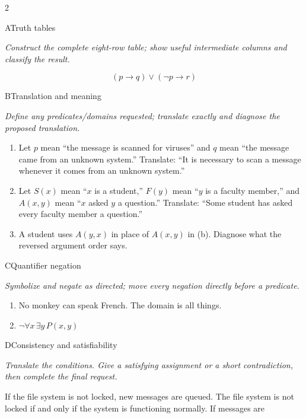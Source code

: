 \documentclass[9pt]{extarticle}
\begin{document}
\CoreWorkArea
\FormBreak
{}
\begin{multicols}{2}
\begin{CoreProblem}{A}{Truth tables}
{\scriptsize\textit{Construct the complete eight-row table; show useful intermediate columns and classify the result.}\par}
\[
  (p\to q)\lor(\neg p\to r)
\]
\end{CoreProblem}
\begin{CoreProblem}{B}{Translation and meaning}
{\scriptsize\textit{Define any predicates/domains requested; translate exactly and diagnose the proposed translation.}\par}
\begin{enumerate}[label=(\alph*)]
  \item Let $p$ mean ``the message is scanned for viruses'' and $q$ mean ``the
        message came from an unknown system.'' Translate: ``It is necessary to
        scan a message whenever it comes from an unknown system.''
  \item Let $S(x)$ mean ``$x$ is a student,'' $F(y)$ mean ``$y$ is a faculty
        member,'' and $A(x,y)$ mean ``$x$ asked $y$ a question.'' Translate:
        ``Some student has asked every faculty member a question.''
  \item A student uses $A(y,x)$ in place of $A(x,y)$ in (b). Diagnose what the
        reversed argument order says.
\end{enumerate}
\end{CoreProblem}
\begin{CoreProblem}{C}{Quantifier negation}
{\scriptsize\textit{Symbolize and negate as directed; move every negation directly before a predicate.}\par}
\begin{enumerate}[label=(\alph*)]
  \item No monkey can speak French. The domain is all things.
  \item $\neg\forall x\,\exists y\,P(x,y)$
\end{enumerate}
\end{CoreProblem}
\columnbreak
\begin{CoreProblem}{D}{Consistency and satisfiability}
{\scriptsize\textit{Translate the conditions. Give a satisfying assignment or a short contradiction, then complete the final request.}\par}
If the file system is not locked, new messages are queued. The file system is
not locked if and only if the system is functioning normally. If messages are

\end{CoreProblem}
\end{multicols}
\end{document}
